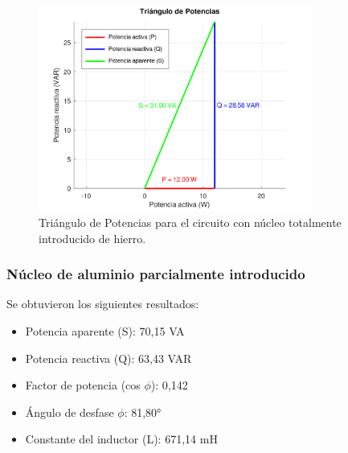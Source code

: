 \documentclass{article}
\begin{document}
                        \begin{figure}[H]
                            \centering
                            \includegraphics[width=0.8\textwidth]{graficoTotalHierro.png}
                            \caption{Triángulo de Potencias para el circuito con núcleo totalmente introducido de hierro.}
                            \label{fig:graficoTotalHierro}
                        \end{figure}


                        \subsubsection{Núcleo de aluminio parcialmente introducido}

                            Se obtuvieron los siguientes resultados:
                        \begin{itemize}
                            \item Potencia aparente (S): 70,15 VA
                            \item Potencia reactiva (Q): 63,43 VAR
                            \item Factor de potencia (cos $\phi$): 0,142
                            \item Ángulo de desfase $\phi$: 81,80°
                            \item Constante del inductor (L): 671,14 mH
                        \end{itemize}

                    
\end{document}
